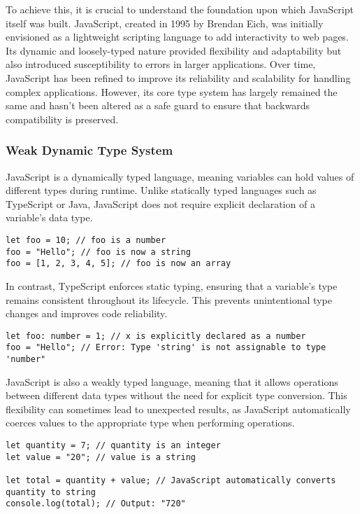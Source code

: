 To achieve this, it is crucial to understand the foundation upon which JavaScript itself was built. JavaScript, created in 1995 by Brendan Eich, was initially envisioned as a lightweight scripting language to add interactivity to web pages. Its dynamic and loosely-typed nature provided flexibility and adaptability but also introduced susceptibility to errors in larger applications. Over time, JavaScript has been refined to improve its reliability and scalability for handling complex applications. However, its core type system has largely remained the same and hasn't been altered as a safe guard to ensure that backwards compatibility is preserved.

\subsubsection{Weak Dynamic Type System}

JavaScript is a dynamically typed language, meaning variables can hold values of different types during runtime. Unlike statically typed languages such as TypeScript or Java, JavaScript does not require explicit declaration of a variable's data type.

\begin{lstlisting}[caption=Holding Values of different Types during Runtime]
let foo = 10; // foo is a number
foo = "Hello"; // foo is now a string
foo = [1, 2, 3, 4, 5]; // foo is now an array
\end{lstlisting}

In contrast, TypeScript enforces static typing, ensuring that a variable's type remains consistent throughout its lifecycle. This prevents unintentional type changes and improves code reliability.

\begin{lstlisting}[caption=Statically Typed Language TypeScript]
let foo: number = 1; // x is explicitly declared as a number
foo = "Hello"; // Error: Type 'string' is not assignable to type 'number"
\end{lstlisting}

JavaScript is also a weakly typed language, meaning that it allows operations between different data types without the need for explicit type conversion. This flexibility can sometimes lead to unexpected results, as JavaScript automatically coerces values to the appropriate type when performing operations.

\begin{lstlisting}[caption=Automatic type conversion in JavaScript]
let quantity = 7; // quantity is an integer
let value = "20"; // value is a string

let total = quantity + value; // JavaScript automatically converts quantity to string
console.log(total); // Output: "720"
\end{lstlisting}

